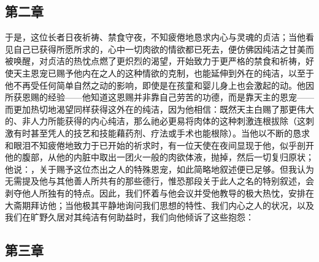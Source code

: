 
\subsection{第二章}

\par

于是，这位长者日夜祈祷、禁食守夜，不知疲倦地恳求内心与灵魂的贞洁；当他看见自己已获得所愿所求的，心中一切肉欲的情欲都已死去，便仿佛因纯洁之甘美而被唤醒，对贞洁的热忱点燃了更炽烈的渴望，开始致力于更严格的禁食和祈祷，好使天主恩宠已赐予他内在之人的这种情欲的克制，也能延伸到外在的纯洁，以至于他不再受任何简单自然之动的影响，即使是在孩童和婴儿身上也会激起的动。他因所获恩赐的经验——他知道这恩赐并非靠自己劳苦的功德，而是靠天主的恩宠——而更加热切地渴望同样获得这外在的纯洁，因为他相信：既然天主白赐了那更伟大的、非人力所能获得的内心纯洁，那么祂必更易将肉体的这种刺激连根拔除（这刺激有时甚至凭人的技艺和技能藉药剂、疗法或手术也能根除）。当他以不断的恳求和眼泪不知疲倦地致力于已开始的祈求时，有一位天使在夜间显现于他，似乎剖开他的腹部，从他的内脏中取出一团火一般的肉欲体液，抛掉，然后一切复归原状；他说：，关于赐予这位杰出之人的特殊恩宠，如此简略地叙述便已足够。但我认为无需提及他与其他善人所共有的那些德行，惟恐那段关于此人之名的特别叙述，会剥夺他人所独有的特点。因此，我们怀着与他会议并受他教导的极大热忱，安排在大斋期拜访他；当他极其平静地询问我们思想的特性、我们内心之人的状况，以及我们在旷野久居对其纯洁有何助益时，我们向他倾诉了这些抱怨：\par


\subsection{第三章}

\par

